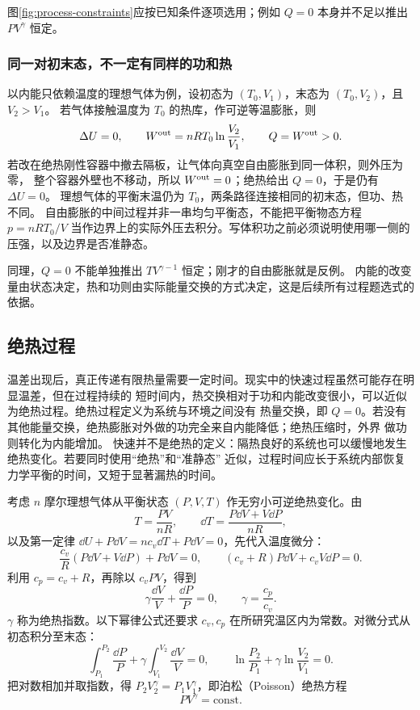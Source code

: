 \processComparisonDiagram
{}\label{fig:process-constraints}
图\ref{fig:process-constraints}应按已知条件逐项选用；例如 $Q=0$ 本身并不足以推出 $PV^\gamma$ 恒定。

\subsubsection*{同一对初末态，不一定有同样的功和热}

以内能只依赖温度的理想气体为例，设初态为 $(T_0,V_1)$，末态为 $(T_0,V_2)$，且 $V_2>V_1$。
若气体接触温度为 $T_0$ 的热库，作可逆等温膨胀，则
\[
 \Delta U=0,\qquad W^{\rm out}=nRT_0\ln\frac{V_2}{V_1},\qquad Q=W^{\rm out}>0.
\]
若改在绝热刚性容器中撤去隔板，让气体向真空自由膨胀到同一体积，则外压为零，
整个容器外壁也不移动，所以 $W^{\rm out}=0$；绝热给出 $Q=0$，于是仍有 $\Delta U=0$。
理想气体的平衡末温仍为 $T_0$，两条路径连接相同的初末态，但功、热不同。
自由膨胀的中间过程并非一串均匀平衡态，不能把平衡物态方程 $p=nRT_0/V$
当作边界上的实际外压去积分。写体积功之前必须说明使用哪一侧的压强，以及边界是否准静态。

同理，$Q=0$ 不能单独推出 $TV^{\gamma-1}$ 恒定；刚才的自由膨胀就是反例。
内能的改变量由状态决定，热和功则由实际能量交换的方式决定，这是后续所有过程题选式的依据。

\subsection*{绝热过程}

温差出现后，真正传递有限热量需要一定时间。现实中的快速过程虽然可能存在明显温差，但在过程持续的
短时间内，热交换相对于功和内能改变很小，可以近似为绝热过程。绝热过程定义为系统与环境之间没有
热量交换，即 $Q=0$。若没有其他能量交换，绝热膨胀对外做的功完全来自内能降低；绝热压缩时，外界
做功则转化为内能增加。
快速并不是绝热的定义：隔热良好的系统也可以缓慢地发生绝热变化。若要同时使用“绝热”和“准静态”
近似，过程时间应长于系统内部恢复力学平衡的时间，又短于显著漏热的时间。

考虑 $n$ 摩尔理想气体从平衡状态 $(P,V,T)$ 作无穷小可逆绝热变化。由
\begin{equation*}
  T=\frac{PV}{nR},
  \qquad
  \dd T=\frac{P\dd V+V\dd P}{nR},
\end{equation*}
以及第一定律 $\dd U+P\dd V=n c_v\dd T+P\dd V=0$，先代入温度微分：
\[
 \frac{c_v}{R}(P\dd V+V\dd P)+P\dd V=0,
 \qquad (c_v+R)P\dd V+c_v V\dd P=0.
\]
利用 $c_p=c_v+R$，再除以 $c_vPV$，得到
\begin{equation}
  \boxed{\gamma\frac{\dd V}{V}+\frac{\dd P}{P}=0},
  \qquad
  \boxed{\gamma=\frac{c_p}{c_v}}. \tag{20.6}
\end{equation}
$\gamma$ 称为绝热指数。以下幂律公式还要求 $c_v,c_p$ 在所研究温区内为常数。对微分式从初态积分至末态：
\[
 \int_{P_1}^{P_2}\frac{\dd P}{P}+\gamma\int_{V_1}^{V_2}\frac{\dd V}{V}=0,
 \qquad \ln\frac{P_2}{P_1}+\gamma\ln\frac{V_2}{V_1}=0.
\]
把对数相加并取指数，得 $P_2V_2^\gamma=P_1V_1^\gamma$，即泊松（Poisson）绝热方程
\begin{equation}
  \boxed{PV^\gamma=\mathrm{const}}. \tag{20.7}
\end{equation}


